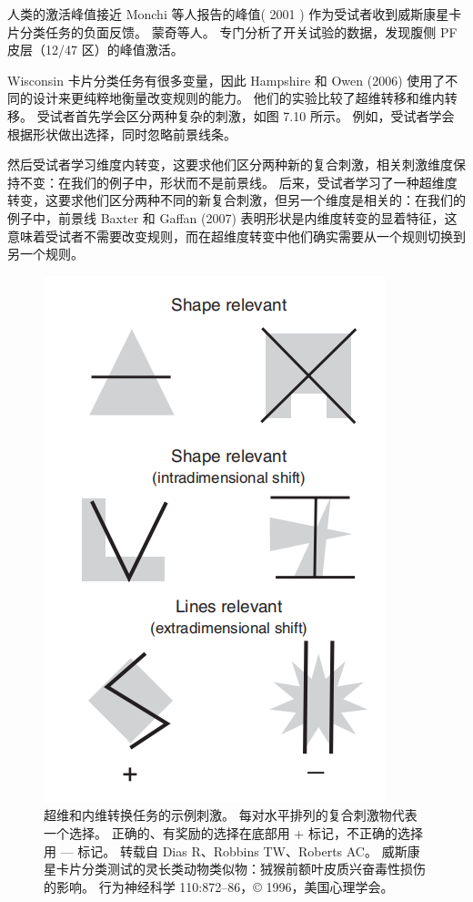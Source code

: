 人类的激活峰值接近 Monchi 等人报告的峰值( 2001 ) 作为受试者收到威斯康星卡片分类任务的负面反馈。 
蒙奇等人。 专门分析了开关试验的数据，发现腹侧 PF 皮层（12/47 区）的峰值激活。
\par
Wisconsin 卡片分类任务有很多变量，因此 Hampshire 和 Owen (2006) 使用了不同的设计来更纯粹地衡量改变规则的能力。 
他们的实验比较了超维转移和维内转移。 
受试者首先学会区分两种复杂的刺激，如图 7.10 所示。 例如，受试者学会根据形状做出选择，同时忽略前景线条。
\par
然后受试者学习维度内转变，这要求他们区分两种新的复合刺激，相关刺激维度保持不变：在我们的例子中，形状而不是前景线。 
后来，受试者学习了一种超维度转变，这要求他们区分两种不同的新复合刺激，但另一个维度是相关的：在我们的例子中，前景线 Baxter 和 Gaffan (2007) 表明形状是内维度转变的显着特征，这意味着受试者不需要改变规则，而在超维度转变中他们确实需要从一个规则切换到另一个规则。
  \begin{figure}
  	\centering
  	\includegraphics[width=0.6\linewidth]{image_pfc/Fig_7_10}
  	\caption{超维和内维转换任务的示例刺激。 
  		每对水平排列的复合刺激物代表一个选择。 
  		正确的、有奖励的选择在底部用 + 标记，不正确的选择用 — 标记。
  		转载自 Dias R、Robbins TW、Roberts AC。 
  		威斯康星卡片分类测试的灵长类动物类似物：狨猴前额叶皮质兴奋毒性损伤的影响。 
  		行为神经科学 110:872–86，© 1996，美国心理学会。}
  	\label{fig:fig}
  \end{figure}
\par
